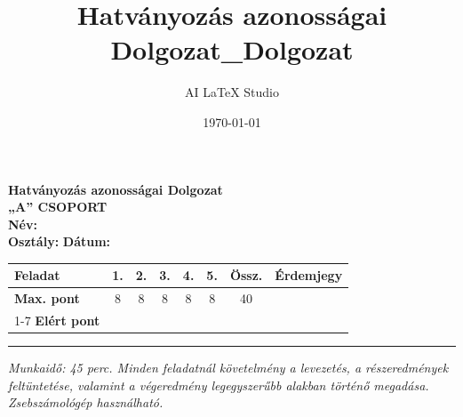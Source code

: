 \documentclass[11pt,a4paper]{article}
\title{Hatványozás azonosságai Dolgozat_Dolgozat}
\author{AI LaTeX Studio}
\date{\today}
\begin{document}

\noindent
\begin{minipage}[t]{0.45\textwidth}
  \vspace{0pt}
  {\Large\textbf{Hatványozás azonosságai Dolgozat}}\\[2mm]
  {\large\textbf{„A” CSOPORT}}\\[2mm]
  \textbf{Név:} \underline{\hspace{4.5cm}}\\[2mm]
  \textbf{Osztály:} \underline{\hspace{1.5cm}} \quad \textbf{Dátum:} \underline{\hspace{2cm}}
\end{minipage}
\hfill
\begin{minipage}[t]{0.53\textwidth}
  \vspace{0pt}
  \begin{flushright}
  {\small
  \begin{tabular}{|l|c|c|c|c|c||c||c|}
    \hline
    \textbf{Feladat} & 1. & 2. & 3. & 4. & 5. & \textbf{Össz.} & \textbf{Érdemjegy} \\ \hline
    \textbf{Max. pont} & 8 & 8 & 8 & 8 & 8 & 40 & \\ \cline{1-7}
    \textbf{Elért pont} & & & & & & & \\ \hline
  \end{tabular}
  }
  \end{flushright}
\end{minipage}
\vspace{2mm}
\hrule
\vspace{4mm}

\noindent
\textit{Munkaidő: 45 perc. Minden feladatnál követelmény a levezetés, a részeredmények feltüntetése, valamint a végeredmény legegyszerűbb alakban történő megadása. Zsebszámológép használható.}

\vspace{3mm}
\end{document}
